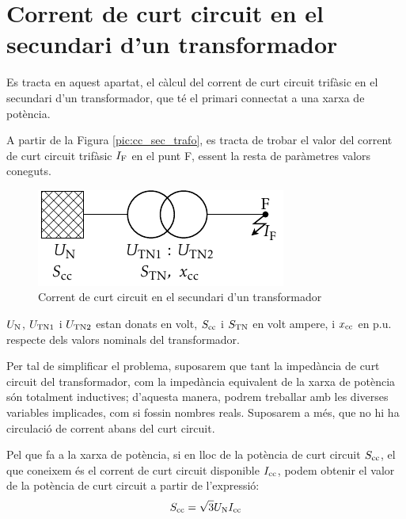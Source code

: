 \section{Corrent de curt circuit en el  secundari d'un transformador}

 Es tracta en aquest apartat, el c\`{a}lcul del corrent de curt
circuit trif\`{a}sic en el secundari d'un transformador, que t\'{e} el
primari connectat  a una xarxa de pot\`{e}ncia.

A partir de la Figura \vref{pic:cc_sec_trafo}, es tracta de trobar
el valor del corrent de curt circuit trif\`{a}sic $I_\mathrm{F}$ en el punt
F, essent la resta de par\`{a}metres valors coneguts.

\begin{figure}[htb]
\vspace{3mm} \centering
    \includegraphics{Imatges/Cap-CalcBas-Icc-Trafo.pdf}
\caption{Corrent de curt circuit en el  secundari d'un
transformador} \label{pic:cc_sec_trafo}
\end{figure}

$U_\mathrm{N}$, $U_\mathrm{TN1}$ i $U_\mathrm{TN2}$ estan donats en volt,
$S_\mathrm{cc}$ i $S_\mathrm{TN}$ en volt ampere, i $x_\mathrm{cc}$ en p.u.
respecte dels valors nominals del transformador.


Per tal de simplificar el problema, suposarem que tant la imped\`{a}ncia
de curt circuit del transformador, com la imped\`{a}ncia equivalent de
la xarxa de pot\`{e}ncia s\'{o}n totalment inductives; d'aquesta manera,
podrem treballar amb les diverses variables implicades, com si
fossin nombres reals. Suposarem a m\'{e}s, que no hi ha circulaci\'{o} de
corrent abans del curt circuit.

Pel que fa a la xarxa de pot\`{e}ncia, si en lloc de la pot\`{e}ncia de curt
circuit $S_\mathrm{cc}$, el que coneixem \'{e}s el corrent de curt circuit
disponible $I_\mathrm{cc}$, podem obtenir el valor de la pot\`{e}ncia de
curt circuit a partir de l'expressi\'{o}:
\begin{equation}
    S_\mathrm{cc} = \sqrt{3} U_\mathrm{N} I_\mathrm{cc}
\end{equation}

